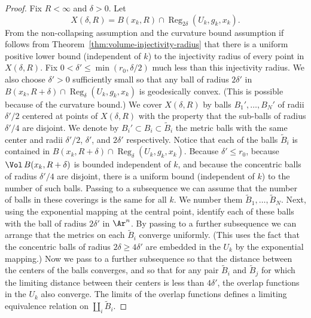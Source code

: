\begin{proof}
\sketch
{}
Fix $R<\infty$ and $\delta>0$. Let
$$X(\delta,R)=B(x_k,R)\cap
\operatorname{Reg}_{2\delta}(U_k,g_k,x_k).$$
 From the non-collapsing assumption
and the curvature bound assumption if follows from
Theorem~\ref{thm:volume-injectivity-radius} that there is a uniform positive lower bound
(independent of $k$) to the injectivity radius of every point in
$X(\delta,R)$. Fix $0<\delta'\le \min(r_0,\delta/2)$ much less
than this injectivity radius. We also choose $\delta'>0$
sufficiently small so that any ball of radius $2\delta'$ in
$B(x_k,R+\delta)\cap \operatorname{Reg}_\delta(U_k,g_k,x_k)$ is geodesically
convex. (This is possible because of the curvature bound.)  We cover
$X(\delta,R)$ by balls $B_1',\ldots,B_N'$
 of radii $\delta'/2$ centered at points of $X(\delta,R)$ with the
property that the sub-balls of radius $\delta'/4$ are disjoint. We
denote by $B_i'\subset B_i\subset \widetilde B_i$ the metric balls
with the same center and radii $\delta'/2$, $\delta'$, and
$2\delta'$ respectively.
 Notice that each of the balls $\widetilde B_i$  is contained in $B(x_k,R+\delta)\cap \operatorname{Reg}_{\delta}(U_k,g_k,x_k)$. Because $\delta'\le r_0$, because $\Vol\,B(x_k,R+\delta)$ is bounded independent of $k$, and because the
concentric balls of radius $\delta'/4$ are disjoint, there is a uniform bound
(independent of $k$) to the number of such balls. Passing to a subsequence we
can assume that the number of balls in these coverings is the same for all $k$.
We number them $\widetilde B_1,\ldots, \widetilde B_N$. Next, using the
exponential mapping at the central point, identify each of these balls with the
ball of radius $2\delta'$ in $\Ar ^n$. By passing to a further subsequence we
can arrange that the metrics on each $\widetilde B_i$ converge uniformly. (This
uses the fact that the concentric balls of radius $2\delta\ge 4\delta'$ are
embedded in the $U_k$ by the exponential mapping.) Now we pass to a further
subsequence so that the distance between the centers of the balls converges,
and so that for any pair $\widetilde B_i$ and $\widetilde B_j$ for which the
limiting distance between their centers is less than $4\delta'$, the overlap
functions in the $U_k$ also converge. The limits of the overlap functions
defines a limiting equivalence relation on $\coprod_i\widetilde B_i$.


\end{proof}

